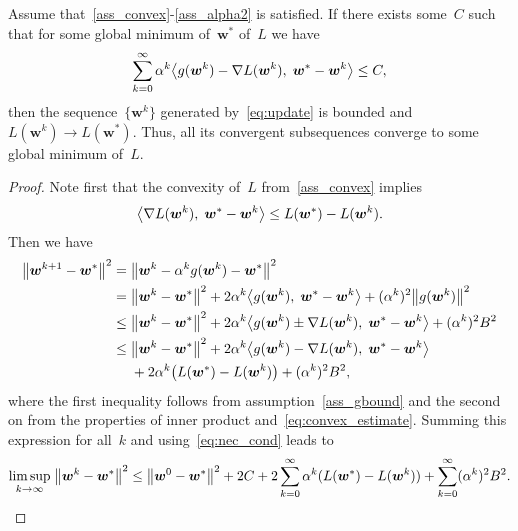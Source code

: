 \begin{theorem}\label{thm:convergence}
  Assume that~\ref{ass_convex}-\ref{ass_alpha2} is satisfied. If there exists some~$C$ such that for some global minimum of~$\bm{w}^*$ of~$L$ we have
  \begin{equation}\label{eq:nec_cond}
    \sum_{k=0}^\infty \alpha^k \inner{g(\bm{w}^k) - \nabla L(\bm{w}^k)}{\bm{w}^* - \bm{w}^k} \le C,
  \end{equation}
  then the sequence~$\{\bm{w}^k\}$ generated by~\eqref{eq:update} is bounded and~$L(\bm{w}^k) \to L(\bm{w}^*)$. Thus, all its convergent subsequences converge to some global minimum of~$L$.
\end{theorem}
\begin{proof}
  Note first that the convexity of~$L$ from~\ref{ass_convex} implies
  \begin{equation}\label{eq:convex_estimate}
    \inner{\nabla L(\bm{w}^k)}{\bm{w}^* - \bm{w}^k} \le L(\bm{w}^*) - L(\bm{w}^k).
  \end{equation}
  Then we have
  \begin{equation*}
    \begin{aligned}
      \norm{\bm{w}^{k+1} - \bm{w}^*}^2
        = \; & \norm{\bm{w}^k - \alpha^k g(\bm{w}^k) - \bm{w}^*}^2 \\
        = \; &\norm{\bm{w}^k - \bm{w}^*}^2 + 2\alpha^k\inner{g(\bm{w}^k)}{\bm{w}^* - \bm{w}^k} + (\alpha^k)^2 \norm{g(\bm{w}^k)}^2 \\
        \le \; &\norm{\bm{w}^k - \bm{w}^*}^2 + 2\alpha^k\inner{g(\bm{w}^k) \pm \nabla L(\bm{w}^k)}{\bm{w}^* - \bm{w}^k} + (\alpha^k)^2 B^2\\
        \le \; & \norm{\bm{w}^k - \bm{w}^*}^2 + 2 \alpha^k \inner{g(\bm{w}^k) - \nabla L(\bm{w}^k)}{\bm{w}^* - \bm{w}^k} \\
        & + 2 \alpha^k \Brac{L(\bm{w}^*) - L(\bm{w}^k)} + (\alpha^k)^2 B^2,
    \end{aligned}
  \end{equation*}
  where the first inequality follows from assumption~\ref{ass_gbound} and the second on from the properties of inner product and~\eqref{eq:convex_estimate}. Summing this expression for all~$k$ and using~\eqref{eq:nec_cond} leads to
  \begin{equation*}
    \limsup_{k \rightarrow \infty} \; \norm{\bm{w}^k - \bm{w}^*}^2
      \le \norm{\bm{w}^0 - \bm{w}^*}^2 + 2C + 2 \sum_{k=0}^\infty \alpha^k (L(\bm{w}^*) - L(\bm{w}^k)) + \sum_{k=0}^ \infty (\alpha^k)^2 B^2.
\end{equation*}

\end{proof}

